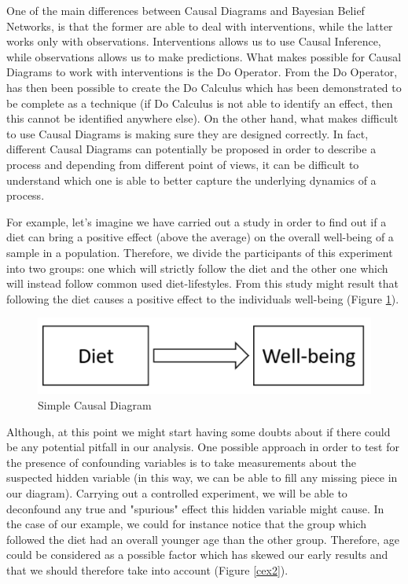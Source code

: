 One of the main differences between Causal Diagrams and Bayesian Belief Networks, is that the former are able to deal with interventions, while the latter works only with observations. Interventions allows us to use Causal Inference, while observations allows us to make predictions. What makes possible for Causal Diagrams to work with interventions is the Do Operator. From the Do Operator, has then been possible to create the Do Calculus which has been demonstrated to be complete as a technique (if Do Calculus is not able to identify an effect, then this cannot be identified anywhere else). On the other hand, what makes difficult to use Causal Diagrams is making sure they are designed correctly. In fact, different Causal Diagrams can potentially be proposed in order to describe a process and depending from different point of views, it can be difficult to understand which one is able to better capture the underlying dynamics of a process.

For example, let's imagine we have carried out a study in order to find out if a diet can bring a positive effect (above the average) on the overall well-being of a sample in a population. Therefore, we divide the participants of this experiment into two groups: one which will strictly follow the diet and the other one which will instead follow common used diet-lifestyles. From this study might result that following the diet causes a positive effect to the individuals well-being (Figure \ref{cex1}).

\begin{figure}[ht!]%
    \centering
    \includegraphics[width=0.4\linewidth]{latex/images/simple_ex.pdf}
    \vspace{-0.2cm}
    \caption{Simple Causal Diagram}
    \label{cex1}
\end{figure}
\vspace{-0.5cm}

Although, at this point we might start having some doubts about if there could be any potential pitfall in our analysis. One possible approach in order to test for the presence of confounding variables is to take measurements about the suspected hidden variable (in this way, we can be able to fill any missing piece in our diagram). Carrying out a controlled experiment, we will be able to deconfound any true and "spurious" effect this hidden variable might cause. In the case of our example, we could for instance notice that the group which followed the diet had an overall younger age than the other group. Therefore, age could be considered as a possible factor which has skewed our early results and that we should therefore take into account (Figure \ref{cex2}).  

